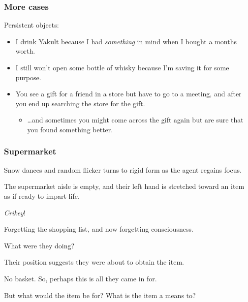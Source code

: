 \documentclass[noamssymb, compress, handout]{beamer} %
\begin{document}
\begin{frame}
  \frametitle{More cases}

  Persistent objects:
\begin{itemize}
\item I drink Yakult because I had \emph{something} in mind when I bought a months worth.
\item I still won't open some bottle of whisky because I'm saving it for some purpose.
\item You see a gift for a friend in a store but have to go to a meeting, and after you end up searching the store for the gift.
  \begin{itemize}
  \item \dots and sometimes you might come across the gift again but are sure that you found something better.
  \end{itemize}
\end{itemize}
\end{frame}


\begin{frame}
  \frametitle{Supermarket}

  {\rmfamily

    Snow dances and random flicker turns to rigid form as the agent regains focus.

    The supermarket aisle is empty, and their left hand is stretched toward an item as if ready to impart life.

    \emph{Crikey}!

    Forgetting the shopping list, and now forgetting consciousness.

    What were they doing?

    Their position suggests they were about to obtain the item.

    No basket. So, perhaps this is all they came in for.

    But what would the item be for?  What is the item a means to?

  }
\end{frame}
\end{document}
